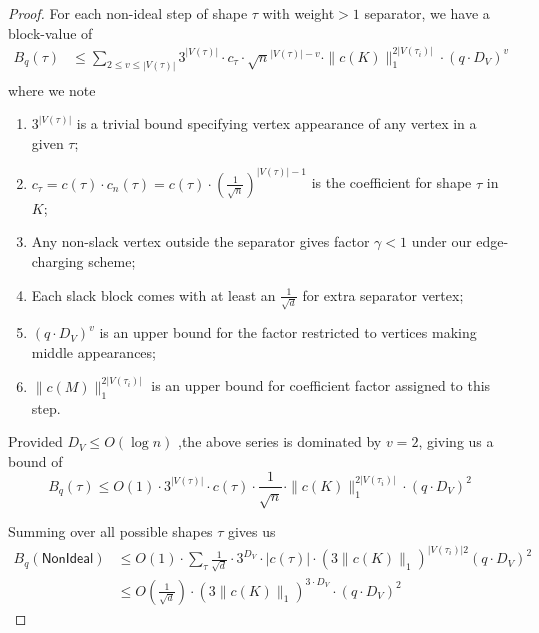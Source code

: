 \documentclass[12pt]{article}
\newcommand{\calB}{\mathcal{B}}
\newcommand{\gam}{\gamma}
\begin{document}
\begin{proof}
	For each non-ideal step of shape $\tau$ with weight$>1$ separator, we have a block-value of
	\begin{align*}
		B_q(\tau) &\leq \sum_{2\leq v\leq |V(\tau)|} 3^{|V(\tau)|} \cdot   c_\tau  \cdot \sqrt{n}^{|V(\tau)|-v }\cdot \|c(K)\|_1^{  2|V(\tau_i)|}  \cdot  (q\cdot D_V)^{v}\\
	\end{align*}
	where we note 
	\begin{enumerate}
		\item $3^{|V(\tau)|}$ is a trivial bound specifying vertex appearance of any vertex in a given $\tau$;
		\item $c_\tau = c(\tau) \cdot c_n(\tau) = c(\tau) \cdot (\frac{1}{\sqrt{n}})^{|V(\tau)|-1}$ is the coefficient for shape $\tau$ in $K$;
		\item Any non-slack vertex outside the separator gives factor $\gam<1$ under our edge-charging scheme; 
		\item Each slack block comes with at least an $\frac{1}{\sqrt{d}}$ for extra separator vertex;
		\item $(q\cdot D_V)^{v}$ is an upper bound for the factor restricted to vertices making middle appearances;
		\item $\|c(M)\|_1^{  2|V(\tau_i)|} $ is an upper bound for coefficient factor assigned to this step.
	\end{enumerate}
	Provided $D_V\leq O(\log n)$ ,the above series is dominated by $v=2$, giving us a bound of \[ 
	B_q(\tau) \leq O(1) \cdot 3^{|V(\tau)|} \cdot   c(\tau) \cdot    \frac{1}{\sqrt{n}} \cdot \|c(K)\|_1^{  2|V(\tau_i)|}  \cdot (q\cdot D_V)^{2}
	\]
	
	Summing over all possible shapes $\tau$ gives us
	\begin{align*}
		B_q(\mathsf{NonIdeal})  &\leq O(1) \cdot \sum_{\tau} \frac{1}{\sqrt{d}} \cdot  3^{D_V} \cdot |c(\tau)| \cdot (3\|c(K) \|_1)^{  |V(\tau_i)|2} (q \cdot D_V)^2\\
		&\leq O(\frac{1}{\sqrt{d}}) \cdot  (3\|c(K)\|_1)^{ 3\cdot D_V} \cdot (q\cdot D_V)^2 
	\end{align*}
 \end{proof}
 
\end{document}
